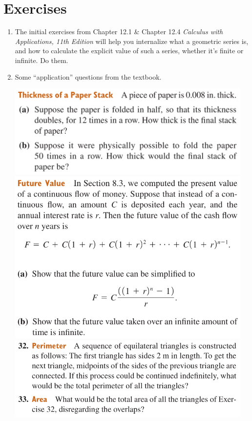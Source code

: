 \newpage

\section*{Exercises}

\begin{enumerate}
    \item %
        The initial exercises from Chapter 12.1 \& Chapter 12.4
        \emph{Calculus with Applications, 11th Edition}
        will help you internalize what a geometric series is,
        and how to calculate the explicit value of such a series,
        whether it's finite or infinite.
        Do them.

    \item Some ``application'' questions from the textbook.
        \begin{center}
            \includegraphics[width=0.96\textwidth]{screenshots/thicc.png}
            \includegraphics[width=0.96\textwidth]{screenshots/value.png}
            \includegraphics[width=0.96\textwidth]{screenshots/triangles.png}

\end{center}
\end{enumerate}
